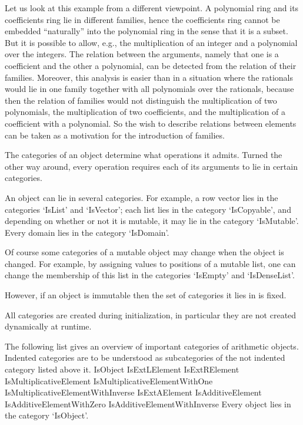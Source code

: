 Let us look at this example from a different viewpoint.
A polynomial ring and its coefficients ring lie in different families,
hence the coefficients ring cannot be embedded ``naturally'' into the
polynomial ring in the sense that it is a subset.
But it is possible to allow, e.g., the multiplication of an integer
and a polynomial over the integers.
The relation between the arguments,
namely that one is a coefficient and the other a polynomial,
can be detected from the relation of their families.
Moreover, this analysis is easier than in a situation where the rationals
would lie in one family together with all polynomials over the rationals,
because then the relation of families would not distinguish
the multiplication of two polynomials,
the multiplication of two coefficients,
and the multiplication of a coefficient with a polynomial.
So the wish to describe relations between elements
can be taken as a motivation for the introduction of families.


The categories of an object determine what operations it admits.
Turned the other way around, every operation requires each of its
arguments to lie in certain categories.

An object can lie in several categories.
For example, a row vector lies in the categories `IsList' and `IsVector';
each list lies in the category `IsCopyable',
and depending on whether or not it is mutable, it may lie in the category
`IsMutable'.
Every domain lies in the category `IsDomain'.

Of course some categories of a mutable object may change when the object
is changed.
For example, by assigning values to positions of a mutable list,
one can change the membership of this list in the categories `IsEmpty'
and `IsDenseList'.

However, if an object is immutable then the set of categories it lies in
is fixed.

All categories are created during initialization,
in particular they are not created dynamically at runtime.

The following list gives an overview of important categories of
arithmetic objects.
Indented categories are to be understood as subcategories of the not
indented category listed above it.
\begintt
    IsObject
        IsExtLElement
        IsExtRElement
            IsMultiplicativeElement
                IsMultiplicativeElementWithOne
                    IsMultiplicativeElementWithInverse
        IsExtAElement
            IsAdditiveElement
                IsAdditiveElementWithZero
                    IsAdditiveElementWithInverse
\endtt
Every object lies in the category `IsObject'.

